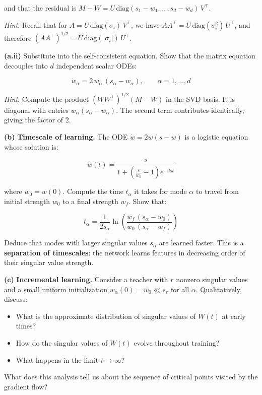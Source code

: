 \documentclass[
]{article}
\providecommand{\tightlist}{%
  \setlength{\itemsep}{0pt}\setlength{\parskip}{0pt}}
\begin{document}
and that the residual is
\(M - W = U\,\text{diag}(s_1 - w_1, \ldots, s_d - w_d)\,V^\top\).

\emph{Hint}: Recall that for \(A = U\,\text{diag}(\sigma_i)\,V^\top\),
we have \(AA^\top = U\,\text{diag}(\sigma_i^2)\,U^\top\), and therefore
\((AA^\top)^{1/2} = U\,\text{diag}(|\sigma_i|)\,U^\top\).

\textbf{(a.ii)} Substitute into the self-consistent equation. Show that
the matrix equation decouples into \(d\) independent scalar ODEs:

\[\dot{w}_\alpha = 2\,w_\alpha\,(s_\alpha - w_\alpha), \qquad \alpha = 1, \ldots, d\]

\emph{Hint}: Compute the product \((WW^\top)^{1/2}(M - W)\) in the SVD
basis. It is diagonal with entries \(w_\alpha(s_\alpha - w_\alpha)\).
The second term contributes identically, giving the factor of 2.

\textbf{(b)} \textbf{Timescale of learning.} The ODE
\(\dot{w} = 2w(s - w)\) is a logistic equation whose solution is:

\[w(t) = \frac{s}{1 + \left(\frac{s}{w_0} - 1\right)e^{-2st}}\]

where \(w_0 = w(0)\). Compute the time \(t_\alpha\) it takes for mode
\(\alpha\) to travel from initial strength \(w_0\) to a final strength
\(w_f\). Show that:

\[t_\alpha = \frac{1}{2 s_\alpha} \ln\left(\frac{w_f\,(s_\alpha - w_0)}{w_0\,(s_\alpha - w_f)}\right)\]

Deduce that modes with larger singular values \(s_\alpha\) are learned
faster. This is a \textbf{separation of timescales}: the network learns
features in decreasing order of their singular value strength.

\textbf{(c)} \textbf{Incremental learning.} Consider a teacher with
\(r\) nonzero singular values and a small uniform initialization
\(w_\alpha(0) = w_0 \ll s_r\) for all \(\alpha\). Qualitatively, discuss:

\begin{itemize}
\tightlist
\item
  What is the approximate distribution of singular values of \(W(t)\) at early times?
\item
  How do the singular values of $W(t)$ evolve throughout training?
\item
  What happens in the limit \(t \to \infty\)?
\end{itemize}

What does this analysis tell us about the sequence of critical points visited by
the gradient flow?
\end{document}
